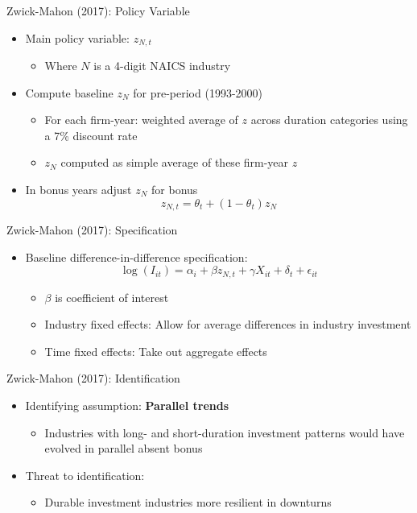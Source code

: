 \documentclass[english,xcolor=svgnames,aspectratio=169]{beamer}
\begin{document}
\begin{frame}{Zwick-Mahon (2017): Policy Variable}
\begin{itemize}
	\itemsep1em 
	\item Main policy variable: $z_{N,t}$
	\begin{itemize}
		\item Where $N$ is a 4-digit NAICS industry
	\end{itemize}
	\item Compute baseline $z_N$ for pre-period (1993-2000)
	\begin{itemize}
		\item For each firm-year: weighted average of $z$ across duration categories using a 7\% discount rate
		\item $z_N$ computed as simple average of these firm-year $z$
	\end{itemize}
	\item In bonus years adjust $z_N$ for bonus
	\[z_{N,t} = \theta_t + (1-\theta_t)z_N \]  
\end{itemize}
\end{frame}


\begin{frame}{Zwick-Mahon (2017): Specification}
\begin{itemize}
	\item Baseline difference-in-difference specification:
	\[\log(I_{it}) = \alpha_i + \beta z_{N,t} + \gamma X_{it} + \delta_t + \epsilon_{it} \] \vspace{-15pt} 
	\begin{itemize}
		\item $\beta$ is coefficient of interest
		\item Industry fixed effects: Allow for average differences in industry investment
		\item Time fixed effects: Take out aggregate effects
	\end{itemize}
\end{itemize}
\end{frame}


\begin{frame}{Zwick-Mahon (2017): Identification}
\begin{itemize}
	\itemsep1em 
	\item Identifying assumption: \textbf{Parallel trends}
	\begin{itemize}
		\item Industries with long- and short-duration investment patterns would have evolved in parallel absent bonus
	\end{itemize}
	\item Threat to identification:
	\begin{itemize}
		\item Durable investment industries more resilient in downturns
	\end{itemize}
\end{itemize}
\end{frame}
\end{document}
